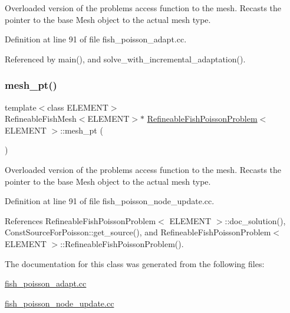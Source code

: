 Overloaded version of the problem\textquotesingle{}s access function to the mesh. Recasts the pointer to the base Mesh object to the actual mesh type. 



Definition at line 91 of file fish\+\_\+poisson\+\_\+adapt.\+cc.



Referenced by main(), and solve\+\_\+with\+\_\+incremental\+\_\+adaptation().

\mbox{\label{classRefineableFishPoissonProblem_a803c9050b07b35aba22f08a5a9e59f2c}} 
\subsubsection{\texorpdfstring{mesh\+\_\+pt()}{mesh\_pt()}\hspace{0.1cm}{\footnotesize\ttfamily [2/2]}}
{\footnotesize\ttfamily template$<$class E\+L\+E\+M\+E\+NT$>$ \\
Refineable\+Fish\+Mesh$<$E\+L\+E\+M\+E\+NT$>$$\ast$ \hyperlink{classRefineableFishPoissonProblem}{Refineable\+Fish\+Poisson\+Problem}$<$ E\+L\+E\+M\+E\+NT $>$\+::mesh\+\_\+pt (\begin{DoxyParamCaption}{ }\end{DoxyParamCaption})\hspace{0.3cm}{\ttfamily [inline]}}



Overloaded version of the problem\textquotesingle{}s access function to the mesh. Recasts the pointer to the base Mesh object to the actual mesh type. 



Definition at line 91 of file fish\+\_\+poisson\+\_\+node\+\_\+update.\+cc.



References Refineable\+Fish\+Poisson\+Problem$<$ E\+L\+E\+M\+E\+N\+T $>$\+::doc\+\_\+solution(), Const\+Source\+For\+Poisson\+::get\+\_\+source(), and Refineable\+Fish\+Poisson\+Problem$<$ E\+L\+E\+M\+E\+N\+T $>$\+::\+Refineable\+Fish\+Poisson\+Problem().



The documentation for this class was generated from the following files\+:\begin{DoxyCompactItemize}
\item 
\hyperlink{fish__poisson__adapt_8cc}{fish\+\_\+poisson\+\_\+adapt.\+cc}\item 
\hyperlink{fish__poisson__node__update_8cc}{fish\+\_\+poisson\+\_\+node\+\_\+update.\+cc}\end{DoxyCompactItemize}
